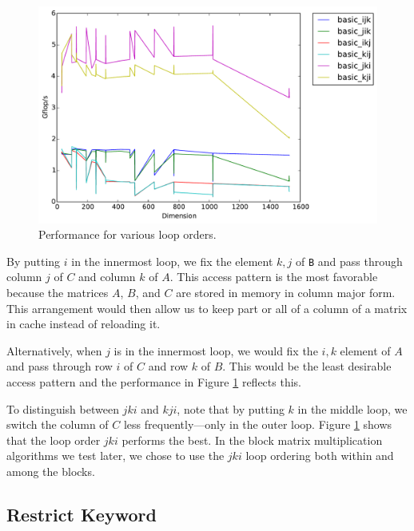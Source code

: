 \documentclass[12pt]{article}
\begin{document}
\begin{center}
\begin{figure}[h]
\includegraphics[width=6in]{timing_basiclooporders_comparison.pdf}
	\caption{Performance for various loop orders.}
	\label{fig:LoopOrders}
\end{figure}
\end{center}

By putting $i$ in the innermost loop, we fix the element $k,j$ of \texttt{B} and pass through column $j$ of $C$ and column $k$ of $A$.
This access pattern is the most favorable because the matrices $A$, $B$, and $C$ are stored in memory in column major form.
This arrangement would then allow us to keep part or all of a column of a matrix in cache instead of reloading it.

Alternatively, when $j$ is in the innermost loop, we would fix the $i,k$ element of $A$ and pass through row $i$ of $C$ and row $k$ of $B$.
This would be the least desirable access pattern and the performance in Figure \ref{fig:LoopOrders} reflects this.

To distinguish between $jki$ and $kji$, note that by putting $k$ in the middle loop, we switch the column of $C$ less frequently---only in the outer loop.
Figure \ref{fig:LoopOrders} shows that the loop order $jki$ performs the best.
In the block matrix multiplication algorithms we test later, we chose to use the $jki$ loop ordering both within and among the blocks.

\subsection{Restrict Keyword}
\end{document}

